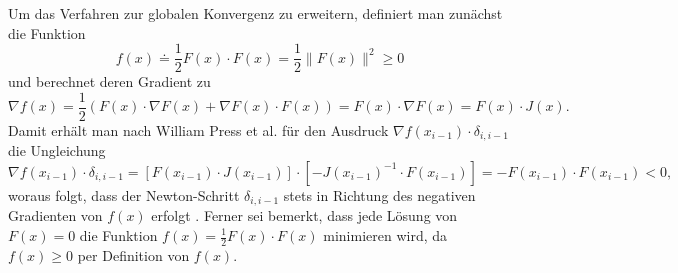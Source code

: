\documentclass[a4paper,12pt]{article}
\numberwithin{equation}{section}
\begin{document}
Um das Verfahren zur globalen Konvergenz zu erweitern, definiert man zunächst die Funktion \begin{equation}
f(x) \doteq \frac{1}{2}F(x)\cdot F(x) = \frac{1}{2} \|F(x)\|^2 \geq 0
\end{equation} und berechnet deren Gradient zu \begin{equation}
\nabla f(x) = \frac{1}{2}(F(x) \cdot \nabla F(x) + \nabla F(x) \cdot F(x)) = F(x)\cdot \nabla F(x) = F(x) \cdot J(x).
\end{equation} Damit erhält man nach William Press et al. für den Ausdruck $\nabla f(x_{i-1}) \cdot \delta_{i,i-1}$ die Ungleichung \small \begin{equation}\label{eq:NewtonSchritt} \nabla f(x_{i-1}) \cdot \delta_{i,i-1} = [F(x_{i-1})\cdot J(x_{i-1})]\cdot [-J(x_{i-1})^{-1}\cdot F(x_{i-1})] = -F(x_{i-1})\cdot F(x_{i-1}) < 0, \end{equation} \normalsize woraus folgt, dass der Newton-Schritt $\delta_{i,i-1}$ stets in Richtung des negativen Gradienten von $f(x)$ erfolgt \cite[S.383]{WilliamH.Press.2002}. Ferner sei bemerkt, dass jede Lösung von $F(x) = 0$ die Funktion $f(x) = \frac{1}{2}F(x)\cdot F(x)$ minimieren wird, da $f(x) \geq 0$ per Definition von $f(x)$. 
\end{document}
